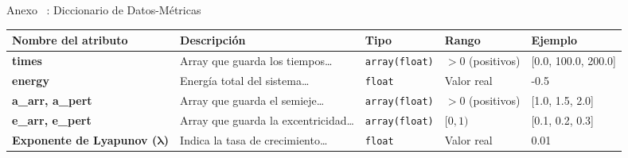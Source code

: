\begin{frame}{Anexo \thesection~: Diccionario de Datos\--Métricas}
  \centering
  \label{tab:diccionario_métricas_slide}
  \begin{adjustbox}{max width=0.9\textwidth}
    \begin{tabular}{@{}p{3cm} p{4cm} p{2.5cm} p{1.5cm} p{2.5cm}@{}}
      \toprule
      \textbf{Nombre del atributo} & \textbf{Descripción} & \textbf{Tipo} & \textbf{Rango} & \textbf{Ejemplo} \\
      \midrule
      \textbf{times} & Array que guarda los tiempos\ldots & \texttt{array(float)} & \(>0\) (positivos) & [0.0, 100.0, 200.0] \\
      \midrule
      \textbf{energy} & Energía total del sistema\ldots & \texttt{float} & Valor real & -0.5 \\
      \midrule
      \textbf{a\_arr, a\_pert} & Array que guarda el semieje\ldots & \texttt{array(float)} & \(>0\) (positivos) & [1.0, 1.5, 2.0] \\
      \midrule
      \textbf{e\_arr, e\_pert} & Array que guarda la excentricidad\ldots & \texttt{array(float)} & $[0, 1)$ & [0.1, 0.2, 0.3] \\
      \midrule
      \textbf{Exponente de Lyapunov ($\mathbf{\lambda}$)}& Indica la tasa de crecimiento\ldots & \texttt{float} & Valor real & 0.01 \\
      \bottomrule
    \end{tabular}
  \end{adjustbox}
\end{frame}